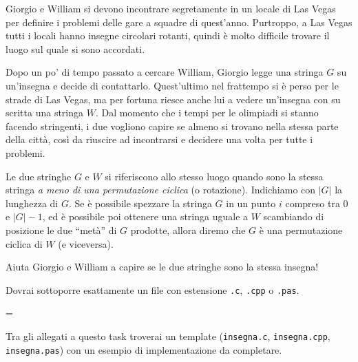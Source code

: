 \usepackage{xcolor}
\usepackage{afterpage}
\usepackage{pifont,mdframed}
\usepackage[bottom]{footmisc}

\makeatletter
\gdef\this@inputfilename{input.txt}
\gdef\this@outputfilename{output.txt}
\makeatother

\newcommand{\inputfile}{\texttt{input.txt}}
\newcommand{\outputfile}{\texttt{output.txt}}

\newenvironment{warning}
  {\par\begin{mdframed}[linewidth=2pt,linecolor=gray]%
    \begin{list}{}{\leftmargin=1cm
                   \labelwidth=\leftmargin}\item[\Large\ding{43}]}
  {\end{list}\end{mdframed}\par}


Giorgio e William si devono incontrare segretamente in un locale di Las Vegas per definire i problemi delle gare a squadre di quest'anno. Purtroppo, a Las Vegas tutti i locali hanno insegne circolari rotanti, quindi è molto difficile trovare il luogo sul quale si sono accordati.

Dopo un po' di tempo passato a cercare William, Giorgio legge una stringa $G$ su un'insegna e decide di contattarlo. Quest'ultimo nel frattempo si è perso per le strade di Las Vegas, ma per fortuna riesce anche lui a vedere un'insegna con su scritta una stringa $W$. Dal momento che i tempi per le olimpiadi si stanno facendo stringenti, i due vogliono capire se almeno si trovano nella stessa parte della città, così da riuscire ad incontrarsi e decidere una volta per tutte i problemi.

Le due stringhe $G$ e $W$ si riferiscono allo stesso luogo quando sono la stessa stringa \emph{a meno di una permutazione ciclica} (o rotazione). Indichiamo con $|G|$ la lunghezza di $G$. Se è possibile spezzare la stringa $G$ in un punto $i$ compreso tra $0$ e $|G|-1$, ed è possibile poi ottenere una stringa uguale a $W$ scambiando di posizione le due ``metà'' di $G$ prodotte, allora diremo che $G$ è una permutazione ciclica di $W$ (e viceversa).

Aiuta Giorgio e William a capire se le due stringhe sono la stessa insegna!

\Implementation
Dovrai sottoporre esattamente un file con estensione \texttt{.c}, \texttt{.cpp} o \texttt{.pas}.

\begin{warning}
Tra gli allegati a questo task troverai un template (\texttt{insegna.c}, \texttt{insegna.cpp}, \texttt{insegna.pas}) con un esempio di implementazione da completare.
\end{warning}

